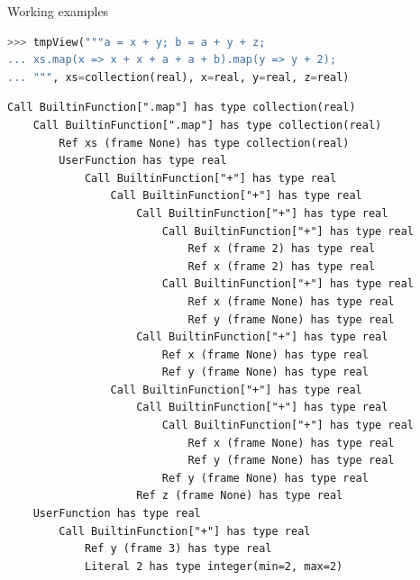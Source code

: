 \documentclass{beamer}
\begin{document}
\begin{frame}[fragile]{Working examples}
\begin{lstlisting}[language=python]
>>> tmpView("""a = x + y; b = a + y + z;
... xs.map(x => x + x + a + a + b).map(y => y + 2);
... """, xs=collection(real), x=real, y=real, z=real)
\end{lstlisting}
\begin{lstlisting}[basicstyle=\ttfamily\tiny]
Call BuiltinFunction[".map"] has type collection(real)
    Call BuiltinFunction[".map"] has type collection(real)
        Ref xs (frame None) has type collection(real)
        UserFunction has type real
            Call BuiltinFunction["+"] has type real
                Call BuiltinFunction["+"] has type real
                    Call BuiltinFunction["+"] has type real
                        Call BuiltinFunction["+"] has type real
                            Ref x (frame 2) has type real
                            Ref x (frame 2) has type real
                        Call BuiltinFunction["+"] has type real
                            Ref x (frame None) has type real
                            Ref y (frame None) has type real
                    Call BuiltinFunction["+"] has type real
                        Ref x (frame None) has type real
                        Ref y (frame None) has type real
                Call BuiltinFunction["+"] has type real
                    Call BuiltinFunction["+"] has type real
                        Call BuiltinFunction["+"] has type real
                            Ref x (frame None) has type real
                            Ref y (frame None) has type real
                        Ref y (frame None) has type real
                    Ref z (frame None) has type real
    UserFunction has type real
        Call BuiltinFunction["+"] has type real
            Ref y (frame 3) has type real
            Literal 2 has type integer(min=2, max=2)
\end{lstlisting}
\end{frame}
\end{document}
